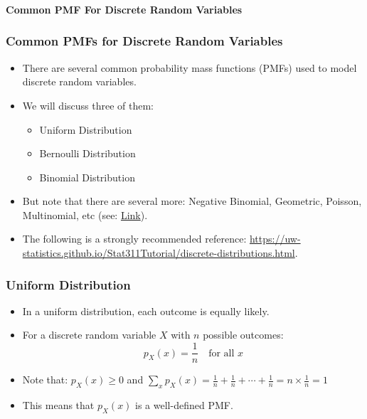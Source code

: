 \documentclass[handout]{beamer} %
\begin{document}
{
\begin{frame}[noframenumbering]
\frametitle{}
\centering
\vspace*{\fill}
{\color{moonstoneblue!170}\textbf{\Large Common PMF For Discrete Random Variables}}
\vspace*{\fill}
\end{frame}
}


\begin{frame}
\frametitle{Common PMFs for Discrete Random Variables}
    \begin{itemize}
        \item There are several common probability mass functions (PMFs) used to model discrete random variables. \pause
        \item We will discuss three of them: \pause
        \begin{itemize}
            \item Uniform Distribution \pause
            \item Bernoulli Distribution \pause
            \item Binomial Distribution
        \end{itemize}
        \item But note that there are several more: Negative Binomial, Geometric, Poisson, Multinomial, etc (see: \href{https://online.stat.psu.edu/stat504/lesson/1/1.3}{Link}).
        \item The following is a strongly recommended reference: \url{https://uw-statistics.github.io/Stat311Tutorial/discrete-distributions.html}.
    \end{itemize}
\end{frame}

\begin{frame}
\frametitle{Uniform Distribution}
    \begin{itemize}
        \item In a uniform distribution, each outcome is equally likely. \pause
        \item For a discrete random variable \( X \) with \( n \) possible outcomes: \pause
        \[
        p_X(x) = \frac{1}{n} \quad \text{for all } x
        \] \pause
        \item Note that: $p_X(x)\geq0$ and $\sum_x p_X(x) = \frac{1}{n} + \frac{1}{n} + \cdots + \frac{1}{n} = n \times \frac{1}{n} = 1 $
        \item This means that $p_X(x)$ is a well-defined PMF.
    \end{itemize}
\end{frame}
\end{document}
